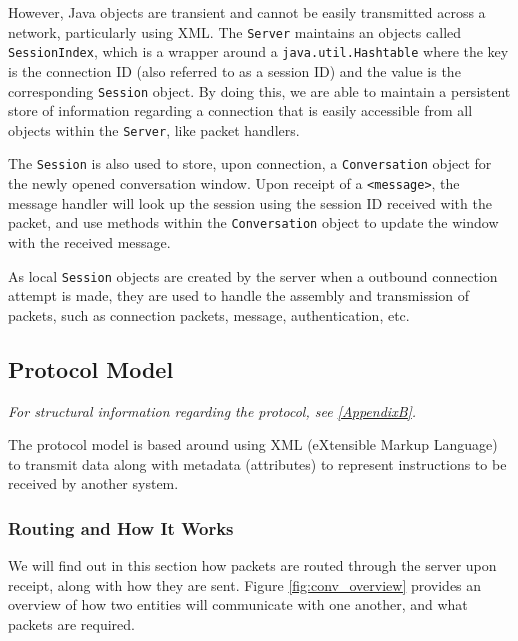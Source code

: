    However, Java objects are transient and cannot be easily transmitted across a network, particularly using XML. The \verb!Server! maintains an objects called \verb!SessionIndex!, which is a wrapper around a \verb!java.util.Hashtable! where the key is the connection ID (also referred to as a session ID) and the value is the corresponding \verb!Session! object. By doing this, we are able to maintain a persistent store of information regarding a connection that is easily accessible from all objects within the \verb!Server!, like packet handlers.
    
    The \verb!Session! is also used to store, upon connection, a \verb!Conversation! object for the newly opened conversation window. Upon receipt of a \verb!<message>!, the message handler will look up the session using the session ID received with the packet, and use methods within the \verb!Conversation! object to update the window with the received message.
    
    As local \verb!Session! objects are created by the server when a outbound connection attempt is made, they are used to handle the assembly and transmission of packets, such as connection packets, message, authentication, etc.
  
  \subsection{Protocol Model}
  
  \emph{For structural information regarding the protocol, see \textsection \ref{AppendixB}.}
  
  The protocol model is based around using XML (eXtensible Markup Language) to transmit data along with metadata (attributes) to represent instructions to be received by another system.
  
    \subsubsection{Routing and How It Works}
    
    We will find out in this section how packets are routed through the server upon receipt, along with how they are sent. Figure \ref{fig:conv_overview} provides an overview of how two entities will communicate with one another, and what packets are required.
    
